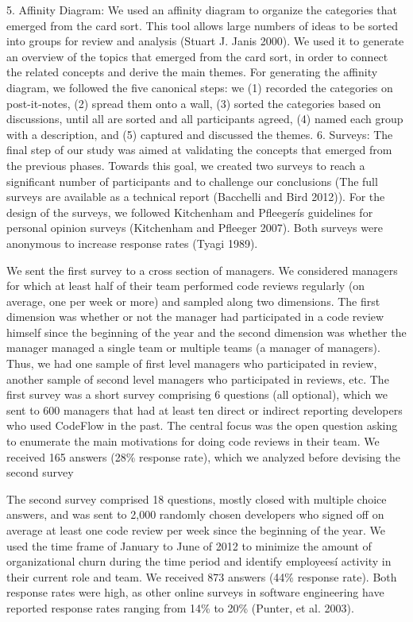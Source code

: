 5. Affinity Diagram: We used an affinity diagram to organize the categories
that emerged from the card sort. This tool allows large numbers of ideas to be
sorted into groups for review and analysis (Stuart J. Janis 2000). We used it
to generate an overview of the topics that emerged from the card sort, in order
to connect the related concepts and derive the main themes. For generating the
affinity diagram, we followed the five canonical steps: we (1) recorded the
categories on post-it-notes, (2) spread them onto a wall, (3) sorted the
categories based on discussions, until all are sorted and all participants
agreed, (4) named each group with a description, and (5) captured and discussed
the themes. 6. Surveys: The final step of our study was aimed at validating the
concepts that emerged from the previous phases. Towards this goal, we created
two surveys to reach a significant number of participants and to challenge our
conclusions (The full surveys are available as a technical report (Bacchelli
and Bird 2012)). For the design of the surveys, we followed Kitchenham and
Pfleegerís guidelines for personal opinion surveys (Kitchenham and Pfleeger
2007). Both surveys were anonymous to increase response rates (Tyagi 1989).

We sent the first survey to a cross section of managers.  We considered
managers for which at least half of their team performed code reviews regularly
(on average, one per week or more) and sampled along two dimensions.  The first
dimension was whether or not the manager had participated in a code review
himself since the beginning of the year and the second dimension was whether
the manager managed a single team or multiple teams (a manager of managers).
Thus, we had one sample of first level managers who participated in review,
another sample of second level managers who participated in reviews, etc.  The
first survey was a short survey comprising 6 questions (all optional), which we
sent to 600 managers that had at least ten direct or indirect reporting
developers who used CodeFlow in the past. The central focus was the open
question asking to enumerate the main motivations for doing code reviews in
their team. We received 165 answers (28\% response rate), which we analyzed
before devising the second survey

The second survey comprised 18 questions, mostly closed with multiple choice
answers, and was sent to 2,000 randomly chosen developers who signed off on
average at least one code review per week since the beginning of the year. We
used the time frame of January to June of 2012 to minimize the amount of
organizational churn during the time period and identify employeesí activity in
their current role and team.  We received 873 answers (44\% response rate). Both
response rates were  high, as other online surveys in software engineering have
reported response rates ranging from 14\% to 20\% (Punter, et al. 2003).
